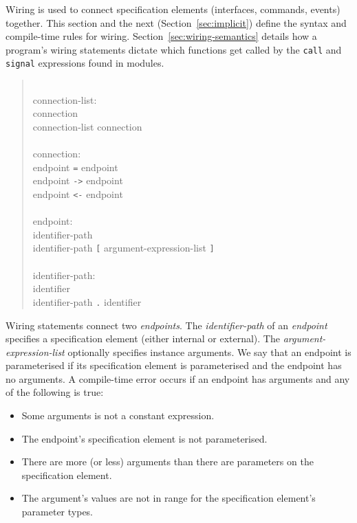 \documentclass[11pt,letterpaper]{article}
\newcommand{\kw}[1]{{\tt #1}}
\newcommand{\grammarshift}{\vspace*{-.7cm}}
\newcommand{\grammarindent}{\hspace*{2cm}\= \\ \kill}
\begin{document}
Wiring is used to connect specification elements (interfaces, commands,
events) together. This section and the next (Section~\ref{sec:implicit})
define the syntax and compile-time rules for
wiring. Section~\ref{sec:wiring-semantics} details how a program's wiring
statements dictate which functions get called by the \kw{call} and
\kw{signal} expressions found in modules. 
\begin{quote} \grammarshift \em \begin{tabbing}
\grammarindent
connection-list:\\
\>	connection\\
\>	connection-list connection\\
\\
connection:\\
\>	endpoint \kw{=} endpoint\\
\>	endpoint \kw{->} endpoint\\
\>	endpoint \kw{<-} endpoint\\
\\
endpoint:\\
\>	identifier-path \\
\>	identifier-path \kw{[} argument-expression-list \kw{]}\\
\\
identifier-path:\\
\>	identifier\\
\>	identifier-path \kw{.} identifier\\
\end{tabbing} \end{quote}


Wiring statements connect two \emph{endpoints}. The
\emph{identifier-path} of an \emph{endpoint} specifies a specification
element (either internal or external). The
\emph{argument-expression-list} optionally specifies instance
arguments. We say that an endpoint is parameterised if its
specification element is parameterised and the endpoint has no
arguments. A compile-time error occurs if an endpoint has
arguments and any of the following is true:
\begin{itemize}
\item Some arguments is not a constant expression.
\item The endpoint's specification element is not parameterised.
\item There are more (or less) arguments than there are parameters
on the specification element.
\item The argument's values are not in range for the specification element's
parameter types.
\end{itemize}
\end{document}
